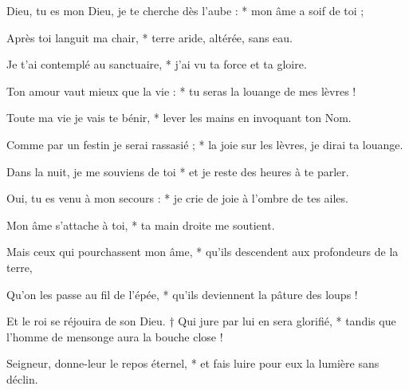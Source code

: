 \item Dieu, tu es mon Dieu, je te cherche dès l'aube : * mon âme a soif de toi ;

\item Après toi languit ma chair, * terre aride, altérée, sans eau.

\item Je t'ai contemplé au sanctuaire, * j'ai vu ta force et ta gloire.

\item Ton amour vaut mieux que la vie : * tu seras la louange de mes lèvres !

\item Toute ma vie je vais te bénir, * lever les mains en invoquant ton Nom.

\item Comme par un festin je serai rassasié ; * la joie sur les lèvres, je dirai ta louange.

\item Dans la nuit, je me souviens de toi * et je reste des heures à te parler.

\item Oui, tu es venu à mon secours : * je crie de joie à l'ombre de tes ailes.

\item Mon âme s'attache à toi, * ta main droite me soutient.

\item Mais ceux qui pourchassent mon âme, * qu'ils descendent aux profondeurs de la terre,

\item Qu'on les passe au fil de l'épée, * qu'ils deviennent la pâture des loups !

\item Et le roi se réjouira de son Dieu. † Qui jure par lui en sera glorifié, * tandis que l'homme de mensonge aura la bouche close !

\item Seigneur, donne-leur le repos éternel, * et fais luire pour eux la lumière sans déclin.